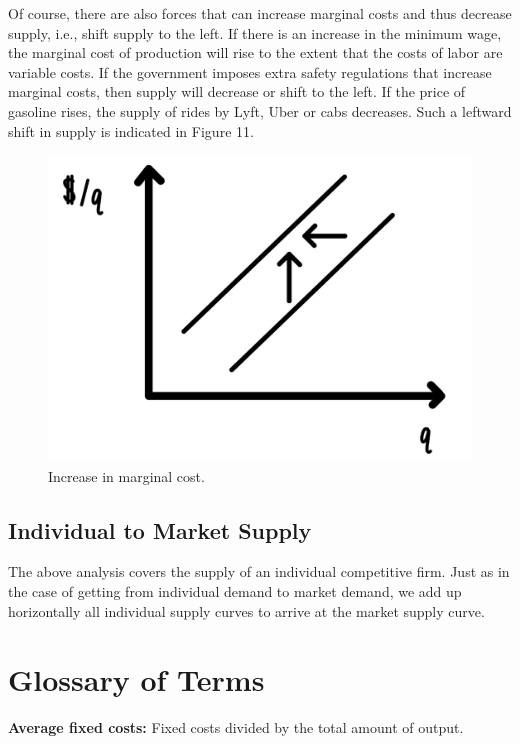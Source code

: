 \documentclass[
]{book}
\begin{document}
Of course, there are also forces that can increase marginal costs and thus decrease supply, i.e., shift supply to the left. If there is an increase in the minimum wage, the marginal cost of production will rise to the extent that the costs of labor are variable costs. If the government imposes extra safety regulations that increase marginal costs, then supply will decrease or shift to the left. If the price of gasoline rises, the supply of rides by Lyft, Uber or cabs decreases. Such a leftward shift in supply is indicated in Figure 11.

\begin{figure}

{\centering \includegraphics[width=0.75\linewidth]{img/supply/fig11} 

}

\caption{Increase in marginal cost.}\label{fig:supply11}
\end{figure}

\hypertarget{individual-to-market-supply}{%
\subsection{Individual to Market Supply}\label{individual-to-market-supply}}

The above analysis covers the supply of an individual competitive firm. Just as in the case of getting from individual demand to market demand, we add up horizontally all individual supply curves to arrive at the market supply curve.

\hypertarget{glossary-of-terms-4}{%
\section{Glossary of Terms}\label{glossary-of-terms-4}}

\textbf{Average fixed costs:} Fixed costs divided by the total amount of output.
\end{document}

